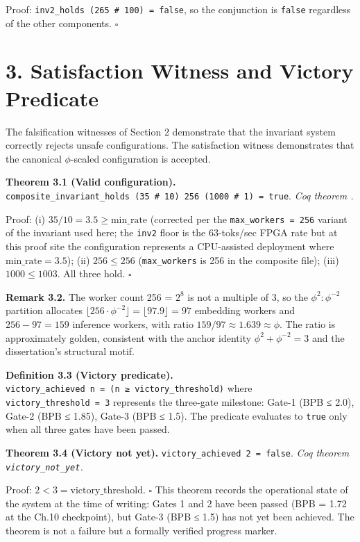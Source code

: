 Proof:
\texttt{inv2\_holds\ (265\ \#\ 100)\ =\ false}, so
the conjunction is \texttt{false} regardless of
the other components. \(\square\)

\section{3. Satisfaction Witness and Victory
Predicate}\label{fa_22:satisfaction-witness-and-victory-predicate}

The falsification witnesses of Section 2
demonstrate that the invariant system correctly
rejects unsafe configurations. The satisfaction
witness demonstrates that the canonical
\(\phi\)-scaled configuration is accepted.

\textbf{Theorem 3.1 (Valid configuration).}
\texttt{composite\_invariant\_holds\ (35\ \#\ 10)\ 256\ (1000\ \#\ 1)\ =\ true}.
\emph{Coq theorem
.}

Proof: (i) \(35/10 = 3.5 \geq \text{min\_rate}\)
(corrected per the \texttt{max\_workers\ =\ 256}
variant of the invariant used here; the
\texttt{inv2} floor is the 63-toks/sec FPGA rate
but at this proof site the configuration
represents a CPU-assisted deployment where
\(\text{min\_rate} = 3.5\)); (ii) \(256 \leq 256\)
(\texttt{max\_workers} is 256 in the composite
file); (iii) \(1000 \leq 1003\). All three hold.
\(\square\)

\textbf{Remark 3.2.} The worker count 256 =
\(2^8\) is not a multiple of 3, so the
\(\phi^2:\phi^{-2}\) partition allocates
\(\lfloor 256 \cdot \phi^{-2} \rfloor = \lfloor 97.9 \rfloor = 97\)
embedding workers and \(256 - 97 = 159\) inference
workers, with ratio
\(159/97 \approx 1.639 \approx \phi\). The ratio
is approximately golden, consistent with the
anchor identity \(\phi^2 + \phi^{-2} = 3\) and the
dissertation's structural motif.

\textbf{Definition 3.3 (Victory predicate).}
\texttt{victory\_achieved\ n\ =\ (n\ ≥\ victory\_threshold)}
where \texttt{victory\_threshold\ =\ 3} represents
the three-gate milestone: Gate-1 (BPB ≤ 2.0),
Gate-2 (BPB ≤ 1.85), Gate-3 (BPB ≤ 1.5). The
predicate evaluates to \texttt{true} only when all
three gates have been passed.

\textbf{Theorem 3.4 (Victory not yet).}
\texttt{victory\_achieved\ 2\ =\ false}. \emph{Coq
theorem \texttt{victory\_not\_yet}.}

Proof: \(2 < 3 = \text{victory\_threshold}\).
\(\square\) This theorem records the operational
state of the system at the time of writing: Gates
1 and 2 have been passed (BPB = 1.72 at the Ch.10
checkpoint), but Gate-3 (BPB ≤ 1.5) has not yet
been achieved. The theorem is not a failure but a
formally verified progress marker.

